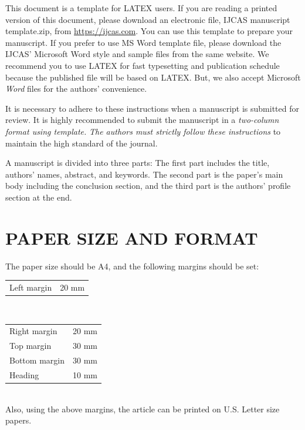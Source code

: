 \documentclass{IJCAS}
\begin{document}
This document is a template for LATEX users. If you are reading a printed version of this document, please download an electronic file, IJCAS manuscript template.zip, from \url{https://ijcas.com}. You can use this template to prepare your manuscript. If you prefer to use MS Word template file, please download the IJCAS' Microsoft Word style and sample files from the same website. We recommend you to use LATEX for fast typesetting and publication schedule because the published file will be based on LATEX. But, we also accept Microsoft \textit{Word} files for the authors' convenience.

It is necessary to adhere to these instructions when a manuscript is submitted for review. It is highly recommended to submit the manuscript in a \textit{two-column format using template.} \textit{The authors must strictly follow these instructions} to maintain the high standard of the journal. 

A manuscript is divided into three parts: The first part includes the title, authors' names, abstract, and keywords. The second part is the paper's main body including the conclusion section, and the third part is the authors' profile section at the end.



\section{PAPER SIZE AND FORMAT}



The paper size should be A4, and the following margins should be set:\\

\begin{tabular}{p{1.1in}p{1.1in}}  
Left margin                & 20 mm \\  
\end{tabular}\\[-1pc]

\vskip -0.5pc
\begin{tabular}{p{1.1in}p{1.1in}} 
Right margin                       & 20 mm \\ 
Top margin             & 30 mm \\  
Bottom margin & 30 mm \\  
Heading & 10 mm 
\end{tabular}\\

\noindent
Also, using the above margins, the article can be printed on U.S. Letter size papers.\\
\end{document}
